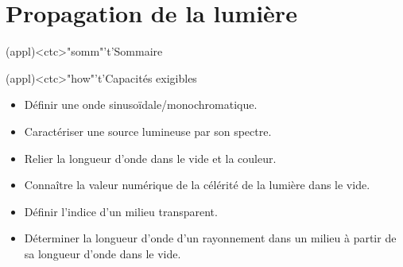 \documentclass[../../main/main.tex]{subfiles}
\begin{document}
\setcounter{chapter}{0}


\chapter{Propagation de la lumi\`ere}

\begin{tcn}(appl)<ctc>"somm"'t'{Sommaire}
	\let\item\olditem
	\vspace{-15pt}
	\minitoc
	\vspace{-25pt}
\end{tcn}

\begin{tcn}[sidebyside](appl)<ctc>"how"'t'{Capacités exigibles}
	\begin{itemize}[label=\rcheck]
		\item Définir une onde sinusoïdale/monochromatique.
		\item Caractériser une source lumineuse par son spectre.
		\item Relier la longueur d'onde dans le vide et la couleur.
	\end{itemize}
	\tcblower
	\begin{itemize}[label=\rcheck]
		\item Connaître la valeur numérique de la célérité de la lumière dans le
		      vide.
		\item Définir l'indice d'un milieu transparent.
		\item Déterminer la longueur d'onde d'un rayonnement dans un milieu à
		      partir de sa longueur d'onde dans le vide.
	\end{itemize}
\end{tcn}
\end{document}

